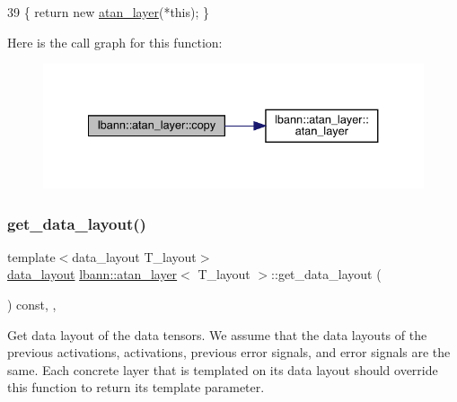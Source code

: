 \begin{DoxyCode}
39 \{ \textcolor{keywordflow}{return} \textcolor{keyword}{new} \hyperlink{classlbann_1_1atan__layer_a8cd5a9ea7688bde095ca6745d372fd4a}{atan\_layer}(*\textcolor{keyword}{this}); \}
\end{DoxyCode}
Here is the call graph for this function\+:\nopagebreak
\begin{figure}[H]
\begin{center}
\leavevmode
\includegraphics[width=334pt]{classlbann_1_1atan__layer_accb8ca944735c1c7acccecc188fe100b_cgraph}
\end{center}
\end{figure}
\mbox{\label{classlbann_1_1atan__layer_ad749b9e41c9b29c98adbad599274e7c9}} 
\subsubsection{\texorpdfstring{get\+\_\+data\+\_\+layout()}{get\_data\_layout()}}
{\footnotesize\ttfamily template$<$data\+\_\+layout T\+\_\+layout$>$ \\
\hyperlink{base_8hpp_a786677cbfb3f5677b4d84f3056eb08db}{data\+\_\+layout} \hyperlink{classlbann_1_1atan__layer}{lbann\+::atan\+\_\+layer}$<$ T\+\_\+layout $>$\+::get\+\_\+data\+\_\+layout (\begin{DoxyParamCaption}{ }\end{DoxyParamCaption}) const\hspace{0.3cm}{\ttfamily [inline]}, {\ttfamily [override]}, {\ttfamily [virtual]}}

Get data layout of the data tensors. We assume that the data layouts of the previous activations, activations, previous error signals, and error signals are the same. Each concrete layer that is templated on its data layout should override this function to return its template parameter. 


